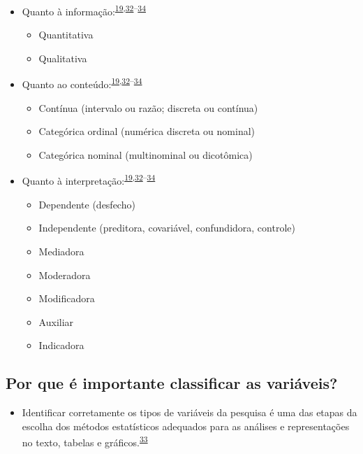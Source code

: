 \documentclass[
]{book}
\providecommand{\tightlist}{%
  \setlength{\itemsep}{0pt}\setlength{\parskip}{0pt}}
\begin{document}
\begin{itemize}
\item
  Quanto à informação:\textsuperscript{\protect\hyperlink{ref-vetter2017}{19},\protect\hyperlink{ref-Ali2016}{32}--\protect\hyperlink{ref-kaliyadan2019}{34}}

  \begin{itemize}
  \item
    Quantitativa
  \item
    Qualitativa
  \end{itemize}
\item
  Quanto ao conteúdo:\textsuperscript{\protect\hyperlink{ref-vetter2017}{19},\protect\hyperlink{ref-Ali2016}{32}--\protect\hyperlink{ref-kaliyadan2019}{34}}

  \begin{itemize}
  \item
    Contínua (intervalo ou razão; discreta ou contínua)
  \item
    Categórica ordinal (numérica discreta ou nominal)
  \item
    Categórica nominal (multinominal ou dicotômica)
  \end{itemize}
\item
  Quanto à interpretação:\textsuperscript{\protect\hyperlink{ref-vetter2017}{19},\protect\hyperlink{ref-Ali2016}{32}--\protect\hyperlink{ref-kaliyadan2019}{34}}

  \begin{itemize}
  \item
    Dependente (desfecho)
  \item
    Independente (preditora, covariável, confundidora, controle)
  \item
    Mediadora
  \item
    Moderadora
  \item
    Modificadora
  \item
    Auxiliar
  \item
    Indicadora
  \end{itemize}
\end{itemize}

\hypertarget{por-que-uxe9-importante-classificar-as-variuxe1veis}{%
\subsection{Por que é importante classificar as variáveis?}\label{por-que-uxe9-importante-classificar-as-variuxe1veis}}

\begin{itemize}
\tightlist
\item
  Identificar corretamente os tipos de variáveis da pesquisa é uma das etapas da escolha dos métodos estatísticos adequados para as análises e representações no texto, tabelas e gráficos.\textsuperscript{\protect\hyperlink{ref-Dettori2018}{33}}
\end{itemize}
\end{document}
